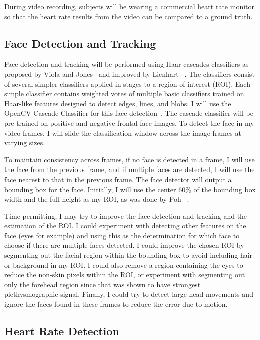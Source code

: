 \documentclass[12pt,twocolumn,letterpaper]{article}
\begin{document}
During video recording, subjects will be wearing a commercial heart rate monitor so that the heart rate results from the video can be compared to a ground truth.

\subsection*{Face Detection and Tracking}

Face detection and tracking will be performed using Haar cascades classifiers as proposed by Viola and Jones~\cite{Viola:2001aa} and improved by Lienhart \etal~\cite{Leinhart:2002aa}. The classifiers consist of several simpler classifiers applied in stages to a region of interest (ROI). Each simple classifier contains weighted votes of multiple basic classifiers trained on Haar-like features designed to detect edges, lines, and blobs. I will use the OpenCV Cascade Classifier for this face detection~\cite{opencv_library}. The cascade classifier will be pre-trained on positive and negative frontal face images. To detect the face in my video frames, I will slide the classification window across the image frames at varying sizes.

To maintain consistency across frames, if no face is detected in a frame, I will use the face from the previous frame, and if multiple faces are detected, I will use the face nearest to that in the previous frame. The face detector will output a bounding box for the face. Initially, I will use the center 60\% of the bounding box width and the full height as my ROI, as was done by Poh \etal~\cite{Poh:2010aa}.

Time-permitting, I may try to improve the face detection and tracking and the estimation of the ROI. I could experiment with detecting other features on the face (eyes for example) and using this as the determination for which face to choose if there are multiple faces detected. I could improve the chosen ROI by segmenting out the facial region within the bounding box to avoid including hair or background in my ROI. I could also remove a region containing the eyes to reduce the non-skin pixels within the ROI, or experiment with segmenting out only the forehead region since that was shown to have strongest plethysmographic signal. Finally, I could try to detect large head movements and ignore the faces found in these frames to reduce the error due to motion.

\subsection*{Heart Rate Detection}
\end{document}

